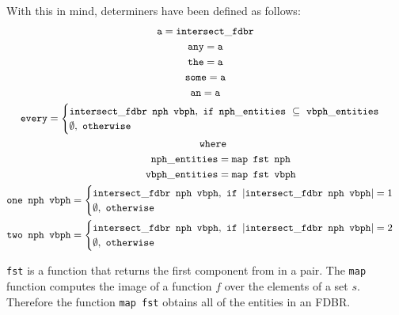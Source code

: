\documentclass[../main.tex]{subfiles}
\begin{document}
With this in mind, determiners have been defined as follows:\\
{\setlength{\mathindent}{0cm}
\begin{gather*}
\mathtt{a} = \mathtt{intersect\_fdbr} \\
\mathtt{any} = \mathtt{a} \\
\mathtt{the} = \mathtt{a}  \\
\mathtt{some} = \mathtt{a}   \\
\mathtt{an} = \mathtt{a}   \\
\mathtt{every} =
\begin{cases}
	\mathtt{intersect\_fdbr}\enspace \mathtt{nph}\enspace \mathtt{vbph},\ \mathtt{if}\enspace \mathtt{nph\_entities}\ \subseteq\ \mathtt{vbph\_entities} \\
	\mathtt{\emptyset},\ \mathtt{otherwise}
\end{cases} \\
\mathtt{\indent where} \\
\mathtt{\indent\indent nph\_entities} = \mathtt{map}\enspace \mathtt{fst}\enspace \mathtt{nph} \\
\mathtt{\indent\indent vbph\_entities} = \mathtt{map}\enspace \mathtt{fst}\enspace \mathtt{vbph} \\
\mathtt{one}\enspace \mathtt{nph}\enspace \mathtt{vbph} =
\begin{cases}
	\mathtt{intersect\_fdbr}\enspace \mathtt{nph}\enspace \mathtt{vbph},\ \mathtt{if}\ \left\vert\mathtt{intersect\_fdbr}\enspace \mathtt{nph}\enspace \mathtt{vbph}\right\vert = 1 \\
	\emptyset,\ \mathtt{otherwise}
\end{cases} \\
\mathtt{two}\enspace \mathtt{nph}\enspace \mathtt{vbph} =
\begin{cases}
\mathtt{intersect\_fdbr}\enspace \mathtt{nph}\enspace \mathtt{vbph},\ \mathtt{if}\ \left\vert\mathtt{intersect\_fdbr}\enspace \mathtt{nph}\enspace \mathtt{vbph}\right\vert = 2 \\
\emptyset,\ \mathtt{otherwise}
\end{cases} \\
\end{gather*}
}

\texttt{fst} is a function that returns the first component from in a pair.  The \texttt{map} function computes the image of a function $f$ over the elements of a set $s$.  
Therefore the function \texttt{map fst} obtains all of the entities in an FDBR.
\end{document}
